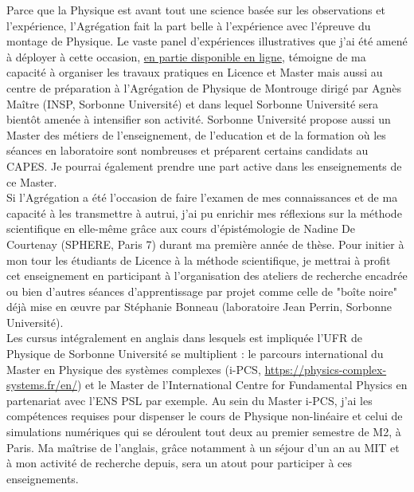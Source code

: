 \documentclass[12pt,onecolumn]{article}
\begin{document}
Parce que la Physique est avant tout une science basée sur les observations et l'expérience, l'Agrégation fait la part belle à l'expérience avec l'épreuve du montage de Physique. Le vaste panel d'expériences illustratives que j'ai été amené à déployer à cette occasion, \href{http://homes.esat.kuleuven.be/~ileyk/teaching.html}{en partie disponible en ligne}, témoigne de ma capacité à organiser les travaux pratiques en Licence et Master mais aussi au centre de préparation à l'Agrégation de Physique de Montrouge dirigé par Agnès Maître (INSP, Sorbonne Université) et dans lequel Sorbonne Université sera bientôt amenée à intensifier son activité. Sorbonne Université propose aussi un Master des métiers de l'enseignement, de l'education et de la formation où les séances en laboratoire sont nombreuses et préparent certains candidats au CAPES. Je pourrai également prendre une part active dans les enseignements de ce Master.\\

Si l'Agrégation a été l'occasion de faire l'examen de mes connaissances et de ma capacité à les transmettre à autrui, j'ai pu enrichir mes réflexions sur la méthode scientifique en elle-même grâce aux cours d'épistémologie de Nadine De Courtenay (SPHERE, Paris 7) durant ma première année de thèse. Pour initier à mon tour les étudiants de Licence à la méthode scientifique, je mettrai à profit cet enseignement en participant à l'organisation des ateliers de recherche encadrée ou bien d'autres séances d'apprentissage par projet comme celle de "boîte noire" déjà mise en \oe uvre par Stéphanie Bonneau (laboratoire Jean Perrin, Sorbonne Université).\\

Les cursus intégralement en anglais dans lesquels est impliquée l'UFR de Physique de Sorbonne Université se multiplient : le parcours international du Master en Physique des systèmes complexes (i-PCS, \href{https://physics-complex-systems.fr/en/}{https://physics-complex-systems.fr/en/}) et le Master de l'International Centre for Fundamental Physics en partenariat avec l'ENS PSL par exemple. Au sein du Master i-PCS, j'ai les compétences requises pour dispenser le cours de Physique non-linéaire et celui de simulations numériques qui se déroulent tout deux au premier semestre de M2, à Paris. Ma maîtrise de l'anglais, grâce notamment à un séjour d'un an au MIT et à mon activité de recherche depuis, sera un atout pour participer à ces enseignements.\\
\end{document}
